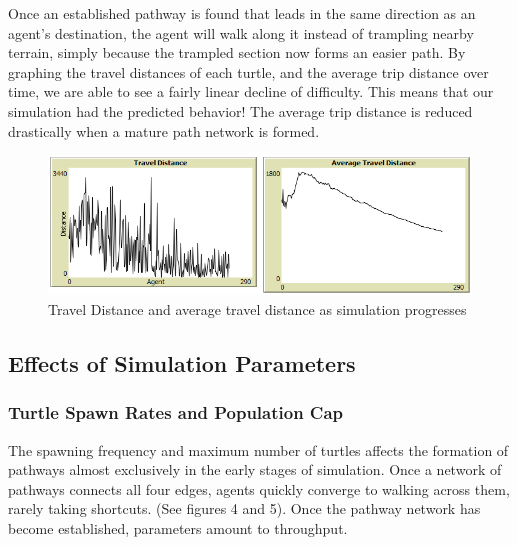 \documentclass[conference]{IEEEtran}
\begin{document}
Once an established pathway is found that leads in the same direction as an agent's destination, the agent will walk along it instead of trampling nearby terrain, simply because the trampled section now forms an easier path. By graphing the travel distances of each turtle, and the average trip distance over time, we are able to see a fairly linear decline of difficulty. This means that our simulation had the predicted behavior! The average trip distance is reduced drastically when a mature path network is formed.

\begin{figure}[h]
\includegraphics[scale=0.5]{image/results3}
\caption{Travel Distance and average travel distance as simulation progresses}
\end{figure}

\subsection{Effects of Simulation Parameters}

\subsubsection{Turtle Spawn Rates and Population Cap}
The spawning frequency and maximum number of turtles affects the formation of pathways almost exclusively in the early stages of simulation. Once a network of pathways connects all four edges, agents quickly converge to walking across them, rarely taking shortcuts. (See figures 4 and 5). Once the pathway network has become established, parameters amount to throughput.
\end{document}

